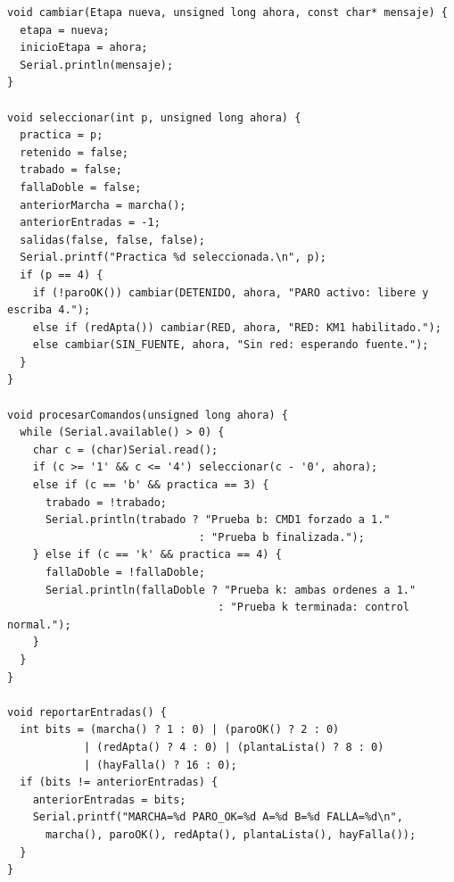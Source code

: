 \documentclass[11pt,a4paper]{article}
\begin{document}
\begin{lstlisting}[style=ino,caption={Programa autónomo de referencia para las cuatro prácticas},label={lst:arduino}]
void cambiar(Etapa nueva, unsigned long ahora, const char* mensaje) {
  etapa = nueva;
  inicioEtapa = ahora;
  Serial.println(mensaje);
}

void seleccionar(int p, unsigned long ahora) {
  practica = p;
  retenido = false;
  trabado = false;
  fallaDoble = false;
  anteriorMarcha = marcha();
  anteriorEntradas = -1;
  salidas(false, false, false);
  Serial.printf("Practica %d seleccionada.\n", p);
  if (p == 4) {
    if (!paroOK()) cambiar(DETENIDO, ahora, "PARO activo: libere y escriba 4.");
    else if (redApta()) cambiar(RED, ahora, "RED: KM1 habilitado.");
    else cambiar(SIN_FUENTE, ahora, "Sin red: esperando fuente.");
  }
}

void procesarComandos(unsigned long ahora) {
  while (Serial.available() > 0) {
    char c = (char)Serial.read();
    if (c >= '1' && c <= '4') seleccionar(c - '0', ahora);
    else if (c == 'b' && practica == 3) {
      trabado = !trabado;
      Serial.println(trabado ? "Prueba b: CMD1 forzado a 1."
                              : "Prueba b finalizada.");
    } else if (c == 'k' && practica == 4) {
      fallaDoble = !fallaDoble;
      Serial.println(fallaDoble ? "Prueba k: ambas ordenes a 1."
                                 : "Prueba k terminada: control normal.");
    }
  }
}

void reportarEntradas() {
  int bits = (marcha() ? 1 : 0) | (paroOK() ? 2 : 0)
            | (redApta() ? 4 : 0) | (plantaLista() ? 8 : 0)
            | (hayFalla() ? 16 : 0);
  if (bits != anteriorEntradas) {
    anteriorEntradas = bits;
    Serial.printf("MARCHA=%d PARO_OK=%d A=%d B=%d FALLA=%d\n",
      marcha(), paroOK(), redApta(), plantaLista(), hayFalla());
  }
}


\end{lstlisting}
\end{document}
